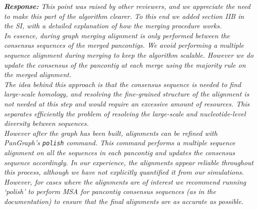 \documentclass[aps,rmp,onecolumn]{revtex4-1}
\newcommand{\response}[1]{{\it {\color{response}\textbf{Response:} #1}}\vskip 5mm}
\newcommand{\SIalgo}{II}
\begin{document}
\response{This point was raised by other reviewers, and we appreciate the need to make this part of the algorithm clearer. 
To this end we added section {\SIalgo}B in the SI, with a detailed explanation of how the merging procedure works.\\
In essence, during graph merging alignment is only performed between the consensus sequences of the merged pancontigs. 
We avoid performing a multiple sequence alignment during merging to keep the algorithm scalable. 
However we do update the consensus of the pancontig at each merge using the majority rule on the merged alignment.\\
The idea behind this approach is that the consensus sequence is needed to find large-scale homology, and resolving the fine-grained structure of the alignment is not needed at this step and would require an excessive amount of resources. 
This separates efficiently the problem of resolving the large-scale and nucleotide-level diversity between sequences.\\
However after the graph has been built, alignments can be refined with \textit{PanGraph}'s \texttt{polish} command. 
This command performs a multiple sequence alignment on all the sequences in each pancontig and updates the consensus sequence accordingly. In our experience, the alignments appear reliable throughout this process, although we have not explicitly quantified it from our simulations. However, for cases where the alignments are of interest we recommend running `polish' to perform MSA for pancontig consensus sequences (as in the documentation) to ensure that the final alignments are as accurate as possible.  
}
\end{document}
